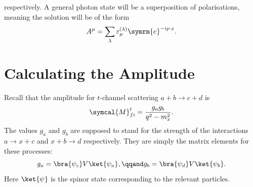 \documentclass[fleqn]{NotesClass}
\newcommand{\e}{\symrm{e}}
\newcommand{\amplitude}{\symcal{M}}
\begin{document}
    respectively.
    A general photon state will be a superposition of polarisations, meaning the solution will be of the form
    \begin{equation}
        A^\mu = \sum_\lambda \varepsilon_\mu^{(\lambda)} \e^{-ip\cdot x}.
    \end{equation}
    
    \section{Calculating the Amplitude}
    Recall that the amplitude for \(t\)-channel scattering \(a + b \to c + d\) is
    \begin{equation}
        \amplitude_{fi}^t = \frac{g_ag_b}{q^2 - m_x^2}.
    \end{equation}
    The values \(g_a\) and \(g_b\) are supposed to stand for the strength of the interactions \(a \to x + c\) and \(x + b \to d\) respectively.
    They are simply the matrix elements for these processes:
    \begin{equation}
        g_a = \bra{\psi_c} V \ket{\psi_a}, \qqand g_b = \bra{\psi_d} V \ket{\psi_b}.
    \end{equation}
    Here \(\ket{\psi}\) is the spinor state corresponding to the relevant particles.
    
\end{document}
